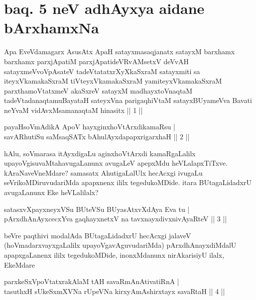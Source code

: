 \section*{baq. 5 neV adhAyxya aidane bArxhamxNa}

\begin{shl}
Apa EveVdamagarx AsusAtx ApaH satayxmasaqjanatx satayxM barxhamx barxhamx parxjApatiM parxjApatideVRvAMsetxV deVvAH satayxmeVvoVpAsateV tadeVtatatxrXyXkaSxraM satayxmiti sa iteyxVkamakaSxraM tiVteyxVkamakaSxraM yamiteyxVkamakaSxraM parxthamoVtatxmeV akaSxreV satayxM madhayxtoV\s naqtaM tadeVtadanaqtamuBayataH sateyxVna parigaqhiVtaM satayxBUyameVva Bavati neYvaM vidAvxMsamanaqtaM hinasitx || 1 ||
\end{shl}


\begin{shl}
payaHsoVmAdikA ApoV hayxginxhoVtArxdikamaRsu | \\
savARhutiSu saMsaqSATx bAhulAyxdapapxrigarxhaH \hfill ||  2 || 
\end{shl}

\begin{artha}
hAlu, soVmarasa itAyxdigaLu aginxhoVtArxdi kamaRgaLalilx upayoVgisuvaMtahavugaLanunx avugaLeV apepxMdu heVLalapxTiTxve. kAraNaveVneMdare? samasatx AhutigaLalUlx hecAcxgi ivugaLu seVrikoMDiruvudariMda apapxnenx ililx tegedukoMDide. itara BUtagaLidadxrU avugaLanunx Eke heVLalilalx?
\end{artha}

\begin{shl}
satasxvXpayxneyxVSu BUteVSu BUyasAtxvXdAya Eva tu | \\
pArxdhAnAyxcecxYva gaqhayxnetxV na tavxnayxdivxnivAyaRteV \hfill ||  3 || 
\end{shl}

\begin{artha}
beVre paqthivi modalAda BUtagaLidadxrU hecAcxgi jalaveV (hoVmadarxvayxgaLalilx upayoVgavAguvudariMda) pArxdhAnayxdiMdalU apapxgaLanenx ililx tegedukoMDide, inonxMdanunx nirAkarisiyU ilalx, EkeMdare \mdash 
\end{artha}

\begin{shl}
parxkeSxVpoVtatxrakAlaM tAH savaRmAnAtivatiRnA | \\
tasuthxH sUkeSxmXVNa rUpeVNa kirxyAmAshirxtayx savaRtaH \hfill ||  4 || 
\end{shl}

